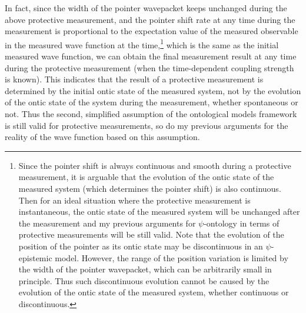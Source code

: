 In fact, since the width of the pointer wavepacket keeps unchanged during the above protective measurement, and the pointer shift rate at any time during the measurement is proportional to the expectation value of the measured observable in the measured wave function at the time,\footnote{Since the pointer shift is always continuous and smooth during a protective measurement, it is arguable that the evolution of the ontic state of the measured system (which determines the pointer shift) is  also continuous. Then for an ideal situation where the protective measurement is instantaneous, the ontic state of the measured system will be unchanged after the measurement and my previous arguments for $\psi$-ontology in terms of protective measurements will be still valid. Note that the evolution of the position of the pointer as its ontic state may be discontinuous in an $\psi$-epistemic model. However, the range of the position variation is limited by the width of the pointer wavepacket, which can be arbitrarily small in principle. Thus such discontinuous evolution cannot be caused by the evolution of the ontic state of the measured system, whether continuous or discontinuous.} which is the same as the initial measured wave function, we can obtain the final measurement result at any time during the protective measurement (when the time-dependent coupling strength is known). This indicates that the result of a protective measurement is determined by the initial ontic state of the measured system, not by the evolution of the ontic state of the system during the measurement, whether spontaneous or not. Thus the second, simplified assumption of the ontological models framework is still valid for protective measurements, so do my previous arguments for the reality of the wave function based on this assumption.



